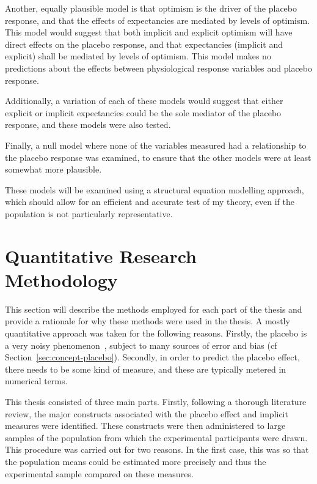 Another, equally plausible model is that optimism is the driver of the placebo response, and that the effects of expectancies are mediated by levels of optimism. This model would suggest that both implicit and explicit optimism will have direct effects on the placebo response, and that expectancies (implicit and explicit) shall be mediated by levels of optimism. This model makes no predictions about the effects between physiological response variables and placebo response. 

Additionally, a variation of each of these models would suggest that either explicit or implicit expectancies could be the sole mediator of the placebo response, and these models were also tested. 

Finally, a null model where none of the variables measured had a relationship to the placebo response was examined, to ensure that the other models were at least somewhat more plausible. 

These models will be examined using a structural equation modelling approach, which should allow for an efficient and accurate test of my theory, even if the population is not particularly representative. 


 


\section{Quantitative Research Methodology}
\label{sec:quant-rese-meth}
This section  will describe the methods employed for each part of the thesis and provide a rationale for why these methods were used in the thesis.
A mostly quantitative approach was taken for the following reasons. Firstly, the placebo  is a very noisy phenomenon~\cite{Singer2005}, subject to many sources of error and bias (cf Section~\ref{sec:concept-placebo}). Secondly, in order to predict the placebo effect, there needs to be some kind of measure, and these are typically metered in numerical terms. 

This thesis consisted of three main parts. Firstly, following a thorough literature review, the major constructs associated with the placebo effect and implicit measures were identified. These constructs were then administered to large samples of the population from which the experimental participants were drawn. This procedure was carried out for two reasons. In the first case, this was so that the population means could be estimated more precisely and thus the experimental sample compared on these measures.  

